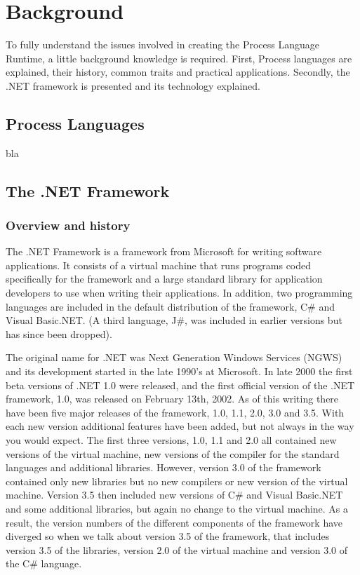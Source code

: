 \chapter{Background}

	To fully understand the issues involved in creating the Process Language 
	Runtime, a little background knowledge is required. First, Process 
	languages are explained, their history, common traits and practical 
	applications. Secondly, the .NET framework is presented and its technology
	explained.

\section{Process Languages}

	bla

\section{The .NET Framework}

\subsection{Overview and history}
	The .NET Framework is a framework from Microsoft for writing software 
	applications. It consists of a virtual machine that runs programs coded 
	specifically for the framework and a large standard library for application 
	developers to use when writing their applications. In addition, two 
	programming languages are included in the default distribution of the 
	framework, C\# and Visual Basic.NET. (A third language, J\#, was included in
	earlier versions but has since been dropped).

	The original name for .NET was Next Generation Windows Services (NGWS) and its
	development started in the late 1990's at Microsoft. In late 2000 the first 
	beta versions of .NET 1.0 were released, and the first official version of the
	.NET framework, 1.0, was released on February 13th, 2002. As of this writing 
	there have been five major releases of the framework, 1.0, 1.1, 2.0, 3.0 and 
	3.5. With each new version additional features have been added, but not always 
	in the way you would expect. The first three versions, 1.0, 1.1 and 2.0 all 
	contained new versions of the virtual machine, new versions of the compiler 
	for the standard languages and additional libraries. However, version 3.0 of 
	the framework contained only new libraries but no new compilers or new version 
	of the virtual machine. Version 3.5 then included new versions of C\# and 
	Visual Basic.NET and some additional libraries, but again no change to the 
	virtual machine. As a result, the version numbers of the different components 
	of the framework have diverged so when we talk about version 3.5 of the 
	framework, that includes version 3.5 of the libraries, version 2.0 of the 
	virtual machine and version 3.0 of the C\# language. 

